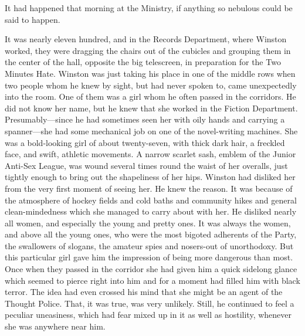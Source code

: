 It had happened that morning at the Ministry, if anything so nebulous
could be said to happen.

It was nearly eleven hundred, and in the Records Department, where
Winston worked, they were dragging the chairs out of the cubicles and
grouping them in the center of the hall, opposite the big telescreen, in
preparation for the Two Minutes Hate. Winston was just taking his place
in one of the middle rows when two people whom he knew by sight, but had
never spoken to, came unexpectedly into the room. One of them was a girl
whom he often passed in the corridors. He did not know her name, but he
knew that she worked in the Fiction Department. Presumably---since he
had sometimes seen her with oily hands and carrying a spanner---she had
some mechanical job on one of the novel-writing machines. She was a
bold-looking girl of about twenty-seven, with thick dark hair, a
freckled face, and swift, athletic movements. A narrow scarlet sash,
emblem of the Junior Anti-Sex League, was wound several times round the
waist of her overalls, just tightly enough to bring out the shapeliness
of her hips. Winston had disliked her from the very first moment of
seeing her. He knew the reason. It was because of the atmosphere of
hockey fields and cold baths and community hikes and general
clean-mindedness which she managed to carry about with her. He disliked
nearly all women, and especially the young and pretty ones. It was
always the women, and above all the young ones, who were the most
bigoted adherents of the Party, the swallowers of slogans, the amateur
spies and nosers-out of unorthodoxy. But this particular girl gave him
the impression of being more dangerous than most. Once when they passed
in the corridor she had given him a quick sidelong glance which seemed
to pierce right into him and for a moment had filled him with black
terror. The idea had even crossed his mind that she might be an agent of
the Thought Police. That, it was true, was very unlikely. Still, he
continued to feel a peculiar uneasiness, which had fear mixed up in it
as well as hostility, whenever she was anywhere near him.

